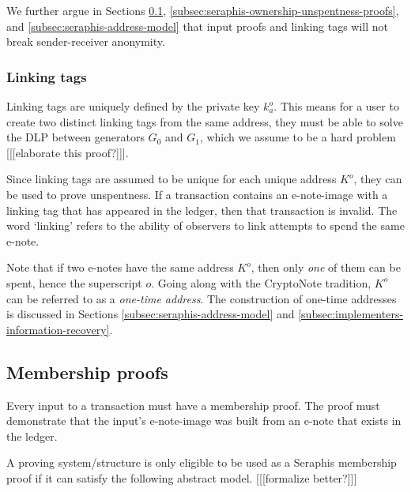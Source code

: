 We further argue in Sections \ref{subsec:seraphis-membership proofs}, \ref{subsec:seraphis-ownership-unspentness-proofs}, and \ref{subsec:seraphis-address-model} that input proofs and linking tags will not break sender-receiver anonymity.

\subsubsection{Linking tags}
\label{subsubsec:e-note-images-linking-tags}

Linking tags are uniquely defined by the private key $k^o_a$. This means for a user to create two distinct linking tags from the same address, they must be able to solve the DLP between generators $G_0$ and $G_1$, which we assume to be a hard problem [[[elaborate this proof?]]].

Since linking tags are assumed to be unique for each unique address $K^o$, they can be used to prove unspentness. If a transaction contains an e-note-image with a linking tag that has appeared in the ledger, then that transaction is invalid. The word `linking' refers to the ability of observers to link attempts to spend the same e-note.

Note that if two e-notes have the same address $K^o$, then only {\em one} of them can be spent, hence the superscript $o$. Going along with the CryptoNote tradition, $K^o$ can be referred to as a {\em one-time address}. The construction of one-time addresses is discussed in Sections \ref{subsec:seraphis-address-model} and \ref{subsec:implementers-information-recovery}.


\subsection{Membership proofs}
\label{subsec:seraphis-membership proofs}

Every input to a transaction must have a membership proof. The proof must demonstrate that the input's e-note-image was built from an e-note that exists in the ledger.

A proving system/structure is only eligible to be used as a Seraphis membership proof if it can satisfy the following abstract model. [[[formalize better?]]]

